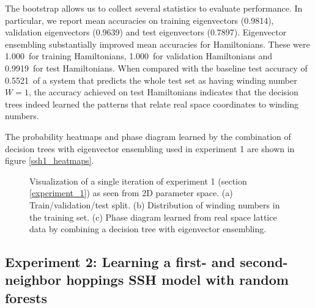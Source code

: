 \documentclass[10pt]{revtex4-1}
\newcommand\sshOneHamTestBaseline{0.5521}
\newcommand\xOneEigTrain{0.9814}
\newcommand\xOneEigVal{0.9639}
\newcommand\xOneEigTest{0.7897}
\newcommand\xOneHamTrain{1.000}
\newcommand\xOneHamVal{1.000}
\newcommand\xOneHamTest{0.9919}
\newcommand\SSHOneTrainValTestSplit{./ssh1_scatter_train_val_test_experiment_0.png}
\newcommand\SSHOneWindingTrain{./ssh1_scatter_winding_train_experiment_0.png}
\newcommand\SSHOnePredictionGrid{./ssh1_pcolormesh_prediction_grid_experiment_0.png}
\begin{document}
The bootstrap allows us to collect several statistics to evaluate performance. In particular, we report mean accuracies on training eigenvectors (\xOneEigTrain), validation eigenvectors (\xOneEigVal) and test eigenvectors (\xOneEigTest). Eigenvector ensembling substantially improved mean accuracies for Hamiltonians. These were \xOneHamTrain\ for training Hamiltonians, \xOneHamVal\ for validation Hamiltonians and \xOneHamTest\ for test Hamiltonians. When compared with the baseline test accuracy of \sshOneHamTestBaseline\ of a system that predicts the whole test set as having winding number $W=1$, the accuracy achieved on test Hamiltonians indicates that the decision trees indeed learned the patterns that relate real space coordinates to winding numbers.

The probability heatmaps and phase diagram learned by the combination of decision trees with eigenvector ensembling used in experiment 1 are shown in figure \ref{ssh1_heatmaps}. 

\begin{figure}
\centering
{}
\caption{Visualization of a single iteration of experiment 1 (section \ref{experiment_1}) as seen from 2D parameter space. (a) Train/validation/test split. (b) Distribution of winding numbers in the training set. (c) Phase diagram learned from real space lattice data by combining a decision tree with eigenvector ensembling.}
\label{figexp1_exp}
\end{figure}

\subsection{Experiment 2: Learning a first- and second-neighbor hoppings SSH model with random forests}
\label{experiment_2}
\end{document}
